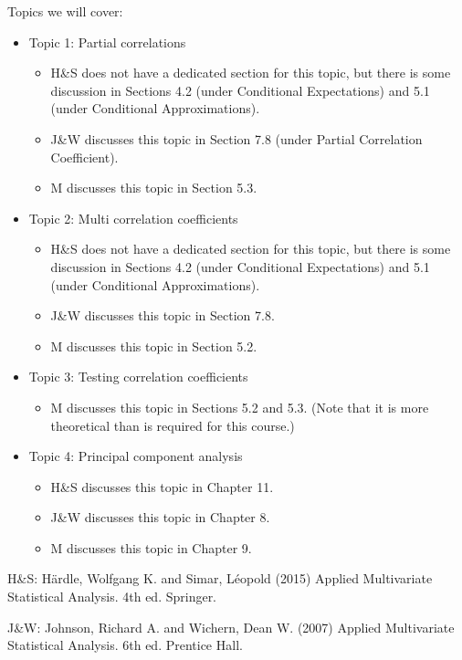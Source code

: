 \documentclass[11pt]{article}
\begin{document}
Topics we will cover:
\begin{itemize}
    \item Topic 1: Partial correlations
    \begin{itemize}
        \item H\&S does not have a dedicated section for this topic, but there is some discussion in Sections 4.2 (under Conditional Expectations) and 5.1 (under Conditional Approximations).
        \item J\&W discusses this topic in Section 7.8 (under Partial Correlation Coefficient).
        \item M discusses this topic in Section 5.3.
    \end{itemize}
    \item Topic 2: Multi correlation coefficients
    \begin{itemize}
        \item H\&S does not have a dedicated section for this topic, but there is some discussion in Sections 4.2 (under Conditional Expectations) and 5.1 (under Conditional Approximations).
        \item J\&W discusses this topic in Section 7.8.
        \item M discusses this topic in Section 5.2.
    \end{itemize}
    \item Topic 3: Testing correlation coefficients
    \begin{itemize}
        \item M discusses this topic in Sections 5.2 and 5.3. (Note that it is more theoretical than is required for this course.)
    \end{itemize}
    \item Topic 4: Principal component analysis
    \begin{itemize}
        \item H\&S discusses this topic in Chapter 11.
        \item J\&W discusses this topic in Chapter 8.
        \item M discusses this topic in Chapter 9.
    \end{itemize}
\end{itemize}

H\&S: Härdle, Wolfgang K. and Simar, Léopold (2015) Applied Multivariate Statistical Analysis. 4th ed. Springer.

J\&W: Johnson, Richard A. and Wichern, Dean W. (2007)  Applied Multivariate Statistical Analysis. 6th ed. Prentice Hall.
\end{document}
